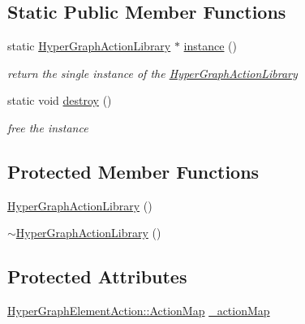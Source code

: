 \subsection*{Static Public Member Functions}
\begin{DoxyCompactItemize}
\item 
static \mbox{\hyperlink{classg2o_1_1_hyper_graph_action_library}{Hyper\+Graph\+Action\+Library}} $\ast$ \mbox{\hyperlink{classg2o_1_1_hyper_graph_action_library_a12074e3f4d9bcb3da20a4fe23d18b745}{instance}} ()
\begin{DoxyCompactList}\small\item\em return the single instance of the \mbox{\hyperlink{classg2o_1_1_hyper_graph_action_library}{Hyper\+Graph\+Action\+Library}} \end{DoxyCompactList}\item 
static void \mbox{\hyperlink{classg2o_1_1_hyper_graph_action_library_aa235ae7c242c522518b07d019dbf8a51}{destroy}} ()
\begin{DoxyCompactList}\small\item\em free the instance \end{DoxyCompactList}\end{DoxyCompactItemize}
\subsection*{Protected Member Functions}
\begin{DoxyCompactItemize}
\item 
\mbox{\hyperlink{classg2o_1_1_hyper_graph_action_library_a68fe0eee5bdda62e6929c3ee2b4b38f1}{Hyper\+Graph\+Action\+Library}} ()
\item 
\mbox{\hyperlink{classg2o_1_1_hyper_graph_action_library_af0d04ecf012d498c09d68725aaf939e5}{$\sim$\+Hyper\+Graph\+Action\+Library}} ()
\end{DoxyCompactItemize}
\subsection*{Protected Attributes}
\begin{DoxyCompactItemize}
\item 
\mbox{\hyperlink{classg2o_1_1_hyper_graph_element_action_abc889fc90ae1bbb63d90c7993777417a}{Hyper\+Graph\+Element\+Action\+::\+Action\+Map}} \mbox{\hyperlink{classg2o_1_1_hyper_graph_action_library_afc9e9b39a743700dcfc896b50d176b3b}{\+\_\+action\+Map}}
\end{DoxyCompactItemize}


